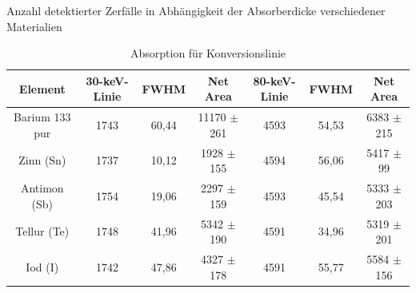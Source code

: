 \documentclass[
	parskip=half,10pt,
	numbers= noenddot, %
	toc=flat, %
	oneside,
	twocolumn,
	]{scrartcl}
\begin{document}
\begin{appendix}
\begin{table}
\begin{small}
\end{small}
\caption{Anzahl detektierter Zerfälle in Abhängigkeit der Absorberdicke verschiedener Materialien}
\end{table}

\begin{table}
\begin{small}
\centering
\begin{tabular}{ccccccc}
 Element & 30-keV-Linie & FWHM & Net Area & 80-keV-Linie & FWHM & Net Area \\
 \hline
 Barium 133 pur & 1743 & 60,44 & 11170 $\pm$ 261 & 4593 & 54,53 & 6383 $\pm$ 215 \\
 Zinn (Sn)      & 1737 & 10,12 &  1928 $\pm$ 155 & 4594 & 56,06 & 5417 $\pm$  99 \\
 Antimon (Sb)   & 1754 & 19,06 &  2297 $\pm$ 159 & 4593 & 45,54 & 5333 $\pm$ 203 \\
 Tellur (Te)    & 1748 & 41,96 &  5342 $\pm$ 190 & 4591 & 34,96 & 5319 $\pm$ 201 \\
 Iod (I)        & 1742 & 47,86 &  4327 $\pm$ 178 & 4591 & 55,77 & 5584 $\pm$ 156 \\
\end{tabular}
\caption{Absorption für Konversionslinie}
\label{tab:konversion}
\end{small}
\end{table}


\end{appendix}
\end{document}
